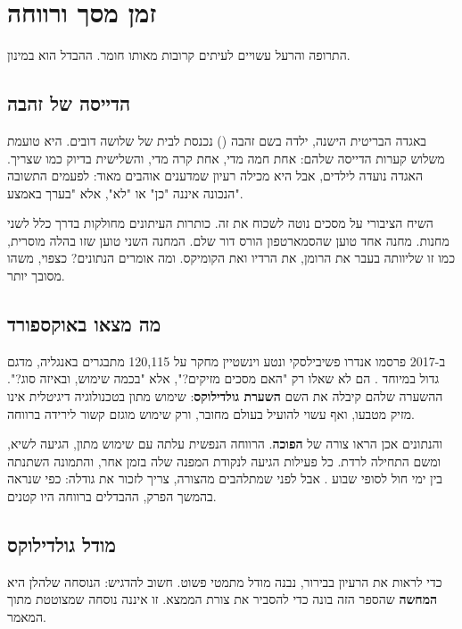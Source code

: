 \chapter{זמן מסך ורווחה}
\label{ch:wellbeing}

\begin{epigraph}{}
התרופה והרעל עשויים לעיתים קרובות מאותו חומר. ההבדל הוא במינון.
\end{epigraph}

\section{הדייסה של זהבה}

באגדה הבריטית הישנה, ילדה בשם זהבה () נכנסת לבית של שלושה דובים. היא טועמת משלוש קערות הדייסה שלהם: אחת חמה מדי, אחת קרה מדי, והשלישית בדיוק כמו שצריך. האגדה נועדה לילדים, אבל היא מכילה רעיון שמדענים אוהבים מאוד: לפעמים התשובה הנכונה איננה "כן" או "לא", אלא "בערך באמצע".

השיח הציבורי על מסכים נוטה לשכוח את זה. כותרות העיתונים מחולקות בדרך כלל לשני מחנות. מחנה אחד טוען שהסמארטפון הורס דור שלם. המחנה השני טוען שזו בהלה מוסרית, כמו זו שליוותה בעבר את הרומן, את הרדיו ואת הקומיקס. ומה אומרים הנתונים? כצפוי, משהו מסובך יותר.

\section{מה מצאו באוקספורד}

ב-2017 פרסמו אנדרו פשיבילסקי ונטע וינשטיין מחקר על 120,115 מתבגרים באנגליה, מדגם גדול במיוחד \parencite{przybylski2017}. הם לא שאלו רק "האם מסכים מזיקים?", אלא "בכמה שימוש, ובאיזה סוג?". ההשערה שלהם קיבלה את השם \textbf{השערת גולדילוקס}: שימוש מתון בטכנולוגיה דיגיטלית אינו מזיק מטבעו, ואף עשוי להועיל בעולם מחובר, ורק שימוש מוגזם קשור לירידה ברווחה.

והנתונים אכן הראו צורה של \textbf{ הפוכה}. הרווחה הנפשית עלתה עם שימוש מתון, הגיעה לשיא, ומשם התחילה לרדת. כל פעילות הגיעה לנקודת המפנה שלה בזמן אחר, והתמונה השתנתה בין ימי חול לסופי שבוע \parencite{przybylski2017}. אבל לפני שמתלהבים מהצורה, צריך לזכור את גודלה: כפי שנראה בהמשך הפרק, ההבדלים ברווחה היו קטנים.

\section{מודל גולדילוקס}

כדי לראות את הרעיון בבירור, נבנה מודל מתמטי פשוט. חשוב להדגיש: הנוסחה שלהלן היא \textbf{המחשה} שהספר הזה בונה כדי להסביר את צורת הממצא. זו איננה נוסחה שמצוטטת מתוך המאמר.

